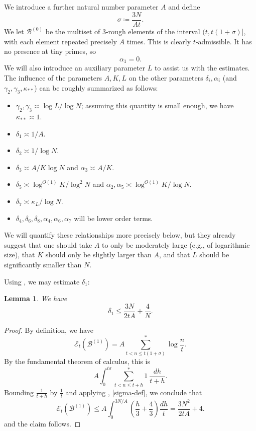 \documentclass[10pt,a4paper,reqno]{amsart}
\numberwithin{equation}{section}
\theoremstyle{plain}
\newtheorem{lemma}[lemma]{Lemma}
\theoremstyle{definition}
\newcommand\tuple{{\mathcal B}}
\newcommand\excess{{\mathcal{E}}}
\begin{document}
We introduce a further natural number parameter $A$ and define
\begin{equation}\label{sigma-def}
  \sigma \coloneqq \frac{3N}{At}.
\end{equation}
We let $\tuple^{(0)}$ be the multiset of $3$-rough elements of the interval $(t, t(1+\sigma)]$, with each element repeated precisely $A$ times.  This is clearly $t$-admissible.  It has no presence at tiny primes, so
\begin{equation}\label{alpha1-vanish}
  \alpha_1 = 0.
\end{equation}
We will also introduce an auxiliary parameter $L$ to assist us with the estimates.  The influence of the parameters $A,K,L$ on the other parameters $\delta_i, \alpha_i$ (and $\gamma_2,\gamma_3,\kappa_{**}$) can be roughly summarized as follows:
\begin{itemize}
\item $\gamma_2, \gamma_3 \asymp \log L / \log N$; assuming this quantity is small enough, we have $\kappa_{**} \asymp 1$.
\item $\delta_1 \asymp 1/A$.
\item $\delta_2 \asymp 1/\log N$.
\item $\delta_3 \asymp A/K\log N$ and $\alpha_3 \asymp A/K$.
\item $\delta_5 \asymp \log^{O(1)} K/\log^2 N$ and $\alpha_2, \alpha_5 \asymp \log^{O(1)} K / \log N$.
\item $\delta_7 \asymp \kappa_L/\log N$.
\item $\delta_4, \delta_6, \delta_8, \alpha_4, \alpha_6, \alpha_7$ will be lower order terms.
\end{itemize}
We will quantify these relationships more precisely below, but they already suggest that one should take $A$ to only be moderately large (e.g., of logarithmic size), that $K$ should only be slightly larger than $A$, and that $L$ should be significantly smaller than $N$.

Using , we may estimate $\delta_1$:

\begin{lemma}\label{delta1-bound} We have
$$ \delta_1 \leq \frac{3N}{2tA} + \frac{4}{N}.$$
\end{lemma}

\begin{proof}  By definition, we have
$$ \excess_t(\tuple^{(1)}) = A \sum^*_{t < n \leq t(1+\sigma)} \log \frac{n}{t}.$$
By the fundamental theorem of calculus, this is
$$ A \int_0^{t\sigma} \sum^*_{t < n \leq t+h} 1\ \frac{dh}{t+h}.$$
Bounding $\frac{1}{t+h}$ by $\frac{1}{t}$ and applying , \eqref{sigma-def}, we conclude that
$$
 \excess_t(\tuple^{(1)}) \leq A \int_0^{3N/A} \left(\frac{h}{3} + \frac{4}{3}\right) \frac{dh}{t} = \frac{3N^2}{2tA} + 4.
$$
and the claim follows.
\end{proof}
\end{document}

